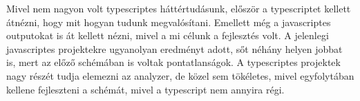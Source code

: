 \noindent

Mivel nem nagyon volt typescriptes háttértudásunk, először a typescriptet kellett átnézni, hogy mit hogyan tudunk megvalósítani.
Emellett még a javascriptes outputokat is át kellett nézni, mivel a mi célunk a fejlesztés volt. A jelenlegi javascriptes projektekre ugyanolyan eredményt adott, sőt néhány helyen jobbat is, mert az előző schémában is voltak pontatlanságok.
A typescriptes projektek nagy részét tudja elemezni az analyzer, de közel sem tökéletes, mivel egyfolytában kellene fejleszteni a schémát, mivel a typescript nem annyira régi.


